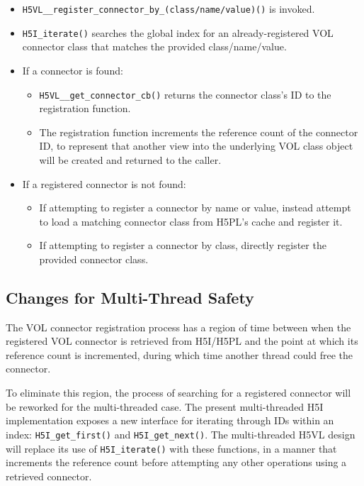\documentclass{article}
\begin{document}
\begin{itemize}
    \item \texttt{H5VL\_\_register\_connector\_by\_(class/name/value)()} is invoked.

    \item \texttt{H5I\_iterate()} searches the global index for an already-registered VOL connector class that matches the provided class/name/value.

    \item If a connector is found:

    \begin{itemize}
    \item \texttt{H5VL\_\_get\_connector\_cb()} returns the connector class's ID to the registration function.

    \item The registration function increments the reference count of the connector ID, to represent that another view into the underlying VOL class object will be created and returned to the caller.
    \end{itemize}


    \item If a registered connector is not found:
    
    \begin{itemize}
        \item If attempting to register a connector by name or value, instead attempt to load a matching connector class from H5PL's cache and register it.

        \item If attempting to register a connector by class, directly register the provided connector class.
    \end{itemize}
\end{itemize}

\subsection{Changes for Multi-Thread Safety}

The VOL connector registration process has a region of time between when the registered VOL connector is retrieved from H5I/H5PL and the point at which its reference count is incremented, during which time another thread could free the connector.

To eliminate this region, the process of searching for a registered connector will be reworked for the multi-threaded case. The present multi-threaded H5I implementation exposes a new interface for iterating through IDs within an index: \texttt{H5I\_get\_first()} and \texttt{H5I\_get\_next()}. The multi-threaded H5VL design will replace its use of \texttt{H5I\_iterate()} with these functions, in a manner that increments the reference count before attempting any other operations using a retrieved connector.
\end{document}
